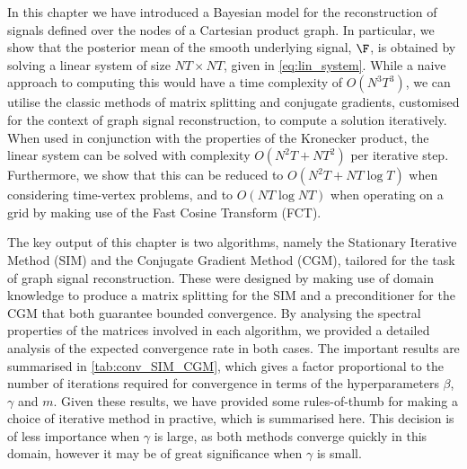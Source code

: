In this chapter we have introduced a Bayesian model for the reconstruction of signals defined over the nodes of a Cartesian product graph. In particular, we show that the posterior mean of the smooth underlying signal, $\F$, is obtained by solving a linear system of size $NT \times NT$, given in \cref{eq:lin_system}. While a naive approach to computing this would have a time complexity of $O(N^3T^3)$, we can utilise the classic methods of matrix splitting and conjugate gradients, customised for the context of graph signal reconstruction, to compute a solution iteratively. When used in conjunction with the properties of the Kronecker product, the linear system can be solved with complexity $O(N^2T + NT^2)$ per iterative step. Furthermore, we show that this can be reduced to $O(N^2T + NT \log T)$ when considering time-vertex problems, and to $O(NT \log NT)$ when operating on a grid by making use of the Fast Cosine Transform (FCT). 

The key output of this chapter is two algorithms, namely the Stationary Iterative Method (SIM) and the Conjugate Gradient Method (CGM), tailored for the task of graph signal reconstruction. These were designed by making use of domain knowledge to produce a matrix splitting for the SIM and a preconditioner for the CGM that both guarantee bounded convergence. By analysing the spectral properties of the matrices involved in each algorithm, we provided a detailed analysis of the expected convergence rate in both cases. The important results are summarised in \cref{tab:conv_SIM_CGM}, which gives a factor proportional to the number of iterations required for convergence in terms of the hyperparameters $\beta$, $\gamma$ and $m$. Given these results, we have provided some rules-of-thumb for making a choice of iterative method in practive, which is summarised here. This decision is of less importance when $\gamma$ is large, as both methods converge quickly in this domain, however it may be of great significance when $\gamma$ is small. 



    








